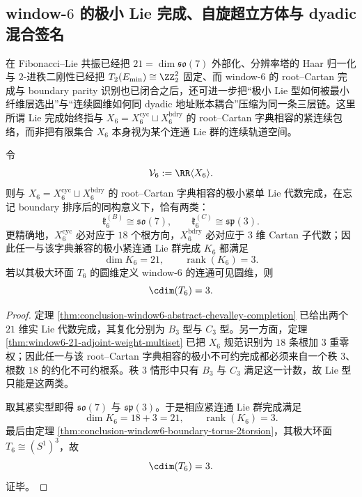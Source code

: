 \subsection{window-\texorpdfstring{$6$}{6} 的极小 Lie 完成、自旋超立方体与 dyadic 混合签名}\label{subsec:conclusion-window6-spin-minuscule-hypercube-signature}
在 Fibonacci--Lie 共振已经把 \(21=\dim \mathfrak{so}(7)\) 外部化、分辨率塔的 Haar 归一化与 \(2\)-进秩二刚性已经把 \(T_2(E_{\min})\cong \ZZ_2^2\) 固定、而 window-\(6\) 的 root--Cartan 完成与 boundary parity 识别也已闭合之后，还可进一步把“极小 Lie 型如何被最小纤维层选出”与“连续圆维如何同 dyadic 地址账本耦合”压缩为同一条三层链。这里所谓 Lie 完成始终指与 \(X_6=X_6^{\mathrm{cyc}}\sqcup X_6^{\mathrm{bdry}}\) 的 root--Cartan 字典相容的紧连续包络，而非把有限集合 \(X_6\) 本身视为某个连通 Lie 群的连续轨道空间。

\begin{theorem}\label{thm:conclusion-window6-minimal-compact-lie-completion-circle-rigidity}
令
\[
\mathcal V_6:=\RR\langle X_6\rangle.
\]
则与 \(X_6=X_6^{\mathrm{cyc}}\sqcup X_6^{\mathrm{bdry}}\) 的 root--Cartan 字典相容的极小紧单 Lie 代数完成，在忘记 boundary 排序后的同构意义下，恰有两类：
\[
\mathfrak k_6^{(B)}\cong \mathfrak{so}(7),
\qquad
\mathfrak k_6^{(C)}\cong \mathfrak{sp}(3).
\]
更精确地，\(X_6^{\mathrm{cyc}}\) 必对应于 \(18\) 个根方向，\(X_6^{\mathrm{bdry}}\) 必对应于 \(3\) 维 Cartan 子代数；因此任一与该字典兼容的极小紧连通 Lie 群完成 \(K_6\) 都满足
\[
\dim K_6=21,
\qquad
\operatorname{rank}(K_6)=3.
\]
若以其极大环面 \(T_6\) 的圆维定义 window-\(6\) 的连通可见圆维，则
\[
\cdim(T_6)=3.
\]
\end{theorem}
\begin{proof}
定理 \ref{thm:conclusion-window6-abstract-chevalley-completion} 已给出两个 \(21\) 维实 Lie 代数完成，其复化分别为 \(B_3\) 型与 \(C_3\) 型。另一方面，定理 \ref{thm:window6-21-adjoint-weight-multiset} 已把 \(X_6\) 规范识别为 \(18\) 条根加 \(3\) 重零权；因此任一与该 root--Cartan 字典相容的极小不可约完成都必须来自一个秩 \(3\)、根数 \(18\) 的约化不可约根系。秩 \(3\) 情形中只有 \(B_3\) 与 \(C_3\) 满足这一计数，故 Lie 型只能是这两类。

取其紧实型即得 \(\mathfrak{so}(7)\) 与 \(\mathfrak{sp}(3)\)。于是相应紧连通 Lie 群完成满足
\[
\dim K_6=18+3=21,
\qquad
\operatorname{rank}(K_6)=3.
\]
最后由定理 \ref{thm:conclusion-window6-boundary-torus-2torsion}，其极大环面 \(T_6\cong (S^1)^3\)，故
\[
\cdim(T_6)=3.
\]
证毕。
\end{proof}

